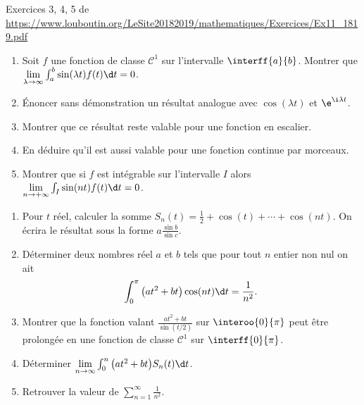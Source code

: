 Exercices 3, 4, 5 de \url{https://www.louboutin.org/LeSite20182019/mathematiques/Exercices/Ex11_1819.pdf}

\begin{exercice}
\begin{enumerate}
    \item Soit $f$ une fonction de classe $\mathscr{C}^1$ sur l'intervalle $\interff{a}{b}$. Montrer que $\lim\limits_{\lambda \to \infty} \int_a^b \sin(\lambda t) f(t) \d t = 0$. 
    \item Énoncer sans démonstration un résultat analogue avec $\cos(\lambda t)$ et $\e^{\i \lambda t}$.
    \item Montrer que ce résultat reste valable pour une fonction en escalier. 
    \item En déduire qu'il est aussi valable pour une fonction continue par morceaux. 
    \item Montrer que si $f$ est intégrable sur l'intervalle $I$ alors $\lim\limits_{n \to +\infty} \int_I \sin(nt) f(t) \d t = 0$.
\end{enumerate}
\end{exercice}


\begin{exercice}
\begin{enumerate}
    \item Pour $t$ réel, calculer la somme $S_n(t) = \frac{1}{2} + \cos(t) + \cdots + \cos(nt)$. On écrira le résultat sous la forme $a \frac{\sin b}{\sin c}$. 
    \item Déterminer deux nombres réel $a$ et $b$ tels que pour tout $n$ entier non nul on ait
    \[
    \int_0^\pi \big(a t^2 + bt\big) \cos(nt) \d t = \frac{1}{n^2}.
    \]
    \item Montrer que la fonction valant $\frac{at^2 + bt}{\sin(t/2)}$ sur $\interoo{0}{\pi}$ peut être prolongée en une fonction de classe $\mathscr{C}^1$ sur $\interff{0}{\pi}$.
    \item Déterminer $\lim\limits_{n \to \infty} \int_0^n \big(a t^2 + bt \big) S_n(t) \d t$.
    \item Retrouver la valeur de $\sum\limits_{n=1}^\infty \frac{1}{n^2}$.
\end{enumerate}
\end{exercice}

